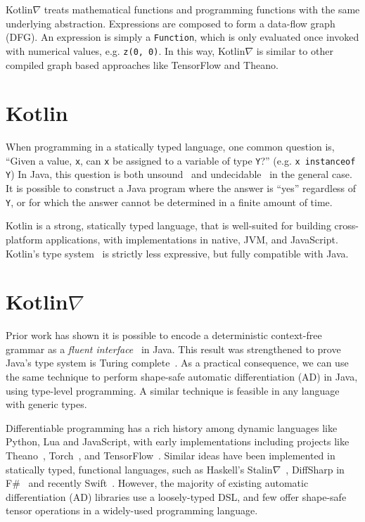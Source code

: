 \documentclass[12pt,initial,twoside,maitrise]{dms}
\def\inline{\lstinline[basicstyle=\ttfamily]}
\numberwithin{equation}{section}
\numberwithin{table}{chapter}
\numberwithin{figure}{chapter}
\begin{document}
Kotlin$\nabla$ treats mathematical functions and programming functions with the same underlying abstraction. Expressions are composed to form a data-flow graph (DFG). An expression is simply a \inline{Function}, which is only evaluated once invoked with numerical values, e.g. \inline{z(0, 0)}. In this way, Kotlin$\nabla$ is similar to other compiled graph based approaches like TensorFlow and Theano.

\section{Kotlin}\label{sec:kotlin}

When programming in a statically typed language, one common question is, ``Given a value, \inline{x}, can \inline{x} be assigned to a variable of type \inline{Y}?'' (e.g. \inline{x instanceof Y}) In Java, this question is both unsound~\cite{amin2016java} and undecidable~\cite{Grigore:2017:JGT:3009837.3009871} in the general case. It is possible to construct a Java program where the answer is ``yes'' regardless of \inline{Y}, or for which the answer cannot be determined in a finite amount of time.

Kotlin is a strong, statically typed language, that is well-suited for building cross-platform applications, with implementations in native, JVM, and JavaScript. Kotlin's type system~\cite{tate2013mixed} is strictly less expressive, but fully compatible with Java.

\section{Kotlin$\nabla$}\label{sec:kotlingrad}

Prior work has shown it is possible to encode a deterministic context-free grammar as a \textit{fluent interface}~\cite{gil2016formal} in Java. This result was strengthened to prove Java's type system is Turing complete~\cite{Grigore:2017:JGT:3009837.3009871}. As a practical consequence, we can use the same technique to perform shape-safe automatic differentiation (AD) in Java, using type-level programming. A similar technique is feasible in any language with generic types.

Differentiable programming has a rich history among dynamic languages like Python, Lua and JavaScript, with early implementations including projects like Theano~\cite{theano}, Torch~\cite{collobert2002torch}, and TensorFlow~\cite{abadi2016tensorflow}. Similar ideas have been implemented in statically typed, functional languages, such as Haskell's Stalin$\nabla$~\cite{pearlmutter2008using}, DiffSharp in F\#~\cite{baydin-diffsharp} and recently Swift~\cite{swift}. However, the majority of existing automatic differentiation (AD) libraries use a loosely-typed DSL, and few offer shape-safe tensor operations in a widely-used programming language.
\end{document}
